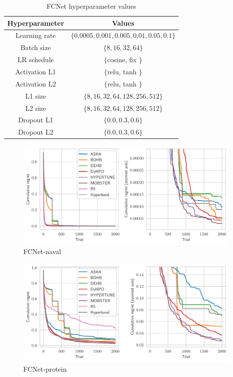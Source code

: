 \begin{table}
    \centering
\begin{tabular}{cc}
    \textbf{Hyperparameter} & \textbf{Values} \\ \midrule
    Learning rate & $\{0.0005, 0.001, 0.005, 0.01, 0.05, 0.1\}$ \\
    Batch size & $\{8, 16, 32, 64\}$ \\
    LR schedule & $\{$cosine, fix $\}$ \\
    Activation L1 & $\{$relu, tanh $\}$ \\
    Activation L2 & $\{$relu, tanh $\}$ \\
    L1 size & $\{8, 16, 32, 64, 128, 256, 512\}$ \\
    L2 size & $\{8, 16, 32, 64, 128, 256, 512\}$ \\
    Dropout L1 & $\{0.0, 0.3, 0.6\}$ \\
    Dropout L2 & $\{0.0, 0.3, 0.6\}$
    \end{tabular}
    \caption{FCNet hyperparameter values}
    \label{tab:fcnet}
\end{table}


\begin{figure}[H]
    \centering
    \includegraphics[scale=0.58]{img/tabular_exp/fcnet-naval_plot.pdf}
    \caption{FCNet-naval}
\end{figure}

\begin{figure}[H]
    \centering
    \includegraphics[scale=0.58]{img/tabular_exp/fcnet-protein_plot.pdf}
    \caption{FCNet-protein}
\end{figure}


